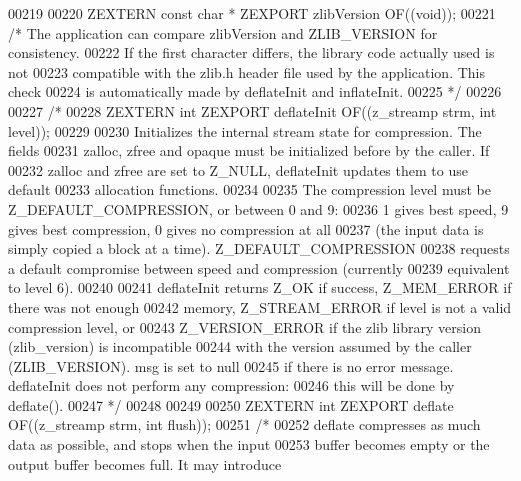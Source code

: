 \begin{DoxyCode}
00219 
00220 ZEXTERN \textcolor{keyword}{const} \textcolor{keywordtype}{char} * ZEXPORT zlibVersion OF((\textcolor{keywordtype}{void}));
00221 \textcolor{comment}{/* The application can compare zlibVersion and ZLIB\_VERSION for consistency.}
00222 \textcolor{comment}{   If the first character differs, the library code actually used is not}
00223 \textcolor{comment}{   compatible with the zlib.h header file used by the application.  This check}
00224 \textcolor{comment}{   is automatically made by deflateInit and inflateInit.}
00225 \textcolor{comment}{ */}
00226 
00227 \textcolor{comment}{/*}
00228 \textcolor{comment}{ZEXTERN int ZEXPORT deflateInit OF((z\_streamp strm, int level));}
00229 \textcolor{comment}{}
00230 \textcolor{comment}{     Initializes the internal stream state for compression.  The fields}
00231 \textcolor{comment}{   zalloc, zfree and opaque must be initialized before by the caller.  If}
00232 \textcolor{comment}{   zalloc and zfree are set to Z\_NULL, deflateInit updates them to use default}
00233 \textcolor{comment}{   allocation functions.}
00234 \textcolor{comment}{}
00235 \textcolor{comment}{     The compression level must be Z\_DEFAULT\_COMPRESSION, or between 0 and 9:}
00236 \textcolor{comment}{   1 gives best speed, 9 gives best compression, 0 gives no compression at all}
00237 \textcolor{comment}{   (the input data is simply copied a block at a time).  Z\_DEFAULT\_COMPRESSION}
00238 \textcolor{comment}{   requests a default compromise between speed and compression (currently}
00239 \textcolor{comment}{   equivalent to level 6).}
00240 \textcolor{comment}{}
00241 \textcolor{comment}{     deflateInit returns Z\_OK if success, Z\_MEM\_ERROR if there was not enough}
00242 \textcolor{comment}{   memory, Z\_STREAM\_ERROR if level is not a valid compression level, or}
00243 \textcolor{comment}{   Z\_VERSION\_ERROR if the zlib library version (zlib\_version) is incompatible}
00244 \textcolor{comment}{   with the version assumed by the caller (ZLIB\_VERSION).  msg is set to null}
00245 \textcolor{comment}{   if there is no error message.  deflateInit does not perform any compression:}
00246 \textcolor{comment}{   this will be done by deflate().}
00247 \textcolor{comment}{*/}
00248 
00249 
00250 ZEXTERN \textcolor{keywordtype}{int} ZEXPORT deflate OF((z\_streamp strm, \textcolor{keywordtype}{int} flush));
00251 \textcolor{comment}{/*}
00252 \textcolor{comment}{    deflate compresses as much data as possible, and stops when the input}
00253 \textcolor{comment}{  buffer becomes empty or the output buffer becomes full.  It may introduce}

\end{DoxyCode}
